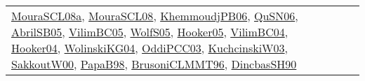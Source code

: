 {\begin{longtable}{lp{3cm}>{\raggedright}p{6cm}>{\raggedright}p{6cm}p{8cm}}
\href{papers/MouraSCL08a.pdf}{MouraSCL08a}\cite{MouraSCL08a}, \href{papers/MouraSCL08.pdf}{MouraSCL08}\cite{MouraSCL08}, \href{papers/KhemmoudjPB06.pdf}{KhemmoudjPB06}\cite{KhemmoudjPB06}, \href{papers/QuSN06.pdf}{QuSN06}\cite{QuSN06}, \href{papers/AbrilSB05.pdf}{AbrilSB05}\cite{AbrilSB05}, \href{articles/VilimBC05.pdf}{VilimBC05}\cite{VilimBC05}, \href{papers/WolfS05.pdf}{WolfS05}\cite{WolfS05}, \href{articles/Hooker05.pdf}{Hooker05}\cite{Hooker05}, \href{papers/VilimBC04.pdf}{VilimBC04}\cite{VilimBC04}, \href{papers/Hooker04.pdf}{Hooker04}\cite{Hooker04}, \href{papers/WolinskiKG04.pdf}{WolinskiKG04}\cite{WolinskiKG04}, \href{papers/OddiPCC03.pdf}{OddiPCC03}\cite{OddiPCC03}, \href{articles/KuchcinskiW03.pdf}{KuchcinskiW03}\cite{KuchcinskiW03}, \href{articles/SakkoutW00.pdf}{SakkoutW00}\cite{SakkoutW00}, \href{articles/PapaB98.pdf}{PapaB98}\cite{PapaB98}, \href{papers/BrusoniCLMMT96.pdf}{BrusoniCLMMT96}\cite{BrusoniCLMMT96}, \href{articles/DincbasSH90.pdf}{DincbasSH90}\cite{DincbasSH90}\\

\end{longtable}}
